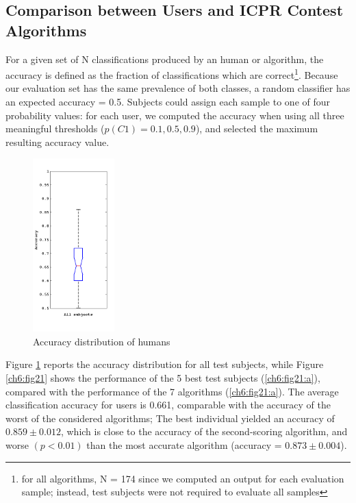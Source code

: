 \vspace{0.5cm}

\subsection{Comparison between Users and ICPR Contest Algorithms}

For a given set of N classifications produced by an human or algorithm, the accuracy is defined as the fraction of classifications which are 
correct\footnote{for all algorithms, N = 174 since we computed an output for each evaluation sample;
instead, test subjects were not required to evaluate all samples}.
Because our evaluation set has the same prevalence of both classes, a random classifier has an expected accuracy = 0.5. Subjects could assign each sample to one of
four probability values: for each user, we computed the accuracy when using all three meaningful thresholds ($p(C1) = {0.1, 0.5, 0.9}$), and selected the maximum
resulting accuracy value.\\

\begin{figure}[!htb]
   \begin{center}
    \includegraphics[width=0.28\textwidth]{./images/human/p11.png}
    \caption{Accuracy distribution of humans}
    \label{ch6:fig20}
    \end{center}
\end{figure}


Figure \ref{ch6:fig20} reports the accuracy distribution for all test subjects, while Figure \ref{ch6:fig21} shows the
performance of the 5 best test subjects (\ref{ch6:fig21:a}), compared with the performance
of the 7 algorithms (\ref{ch6:fig21:a}). The average classification accuracy for users is 0.661,
comparable with the accuracy of the worst of the considered algorithms; The best
individual yielded an accuracy of $0.859 \pm 0.012$, which is close to the accuracy
of the second-scoring algorithm, and worse $(p < 0.01)$ than the most accurate
algorithm (accuracy = $0.873 \pm 0.004$).


